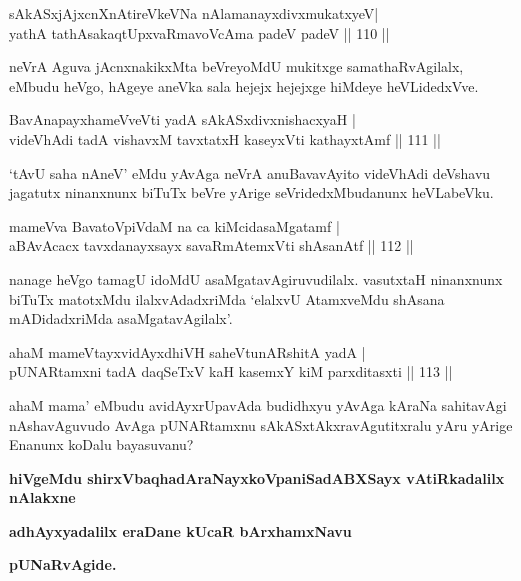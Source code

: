 \begin{shl}
sAkASxjAjxcnXnAtireVkeVNa nAlamanayxdivxmukatxyeV|\\
yathA tathA\s sakaqtUpxvaRmavoVcAma padeV padeV \hfill || 110 || 
\end{shl}

\begin{artha}
neVrA Aguva jAcnxnakikxMta beVreyoMdU mukitxge samathaRvAgilalx, eMbudu heVgo, hAgeye aneVka sala hejejx hejejxge hiMdeye heVLidedxVve.
\end{artha}


\begin{shl}
BavAnapayxhameVveVti yadA sAkASxdivxnishacxyaH |\\
videVhAdi tadA vishavxM tavxtatxH kaseyxVti kathayxtAmf \hfill || 111 || 
\end{shl}

\begin{artha}
`tAvU saha nAneV' eMdu yAvAga neVrA anuBavavAyito videVhAdi deVshavu jagatutx ninanxnunx biTuTx beVre yArige seVridedxMbudanunx heVLabeVku.
\end{artha}


\begin{shl}
mameVva BavatoV\s piVdaM na ca kiMcidasaMgatamf |\\
aBAvAcacx tavxdanayxsayx savaRmAtemxVti shAsanAtf  \hfill || 112 || 
\end{shl}

\begin{artha}
nanage heVgo tamagU idoMdU asaMgatavAgiruvudilalx. vasutxtaH ninanxnunx biTuTx matotxMdu ilalxvAdadxriMda `elalxvU AtamxveMdu shAsana mADidadxriMda asaMgatavAgilalx'.
\end{artha}

\begin{shl}
ahaM mameVtayxvidAyxdhiVH saheVtunARshitA yadA |\\
pUNARtamxni tadA daqSeTxV kaH kasemxY kiM parxditasxti \hfill || 113 || 
\end{shl}

\begin{artha}
ahaM mama' eMbudu avidAyxrUpavAda budidhxyu yAvAga kAraNa sahitavAgi nAshavAguvudo AvAga pUNARtamxnu sAkASxtAkxravAgutitxralu yAru yArige Enanunx koDalu bayasuvanu?
\end{artha}

\begin{center}
{\bf hiVgeMdu shirxVbaqhadAraNayxkoVpaniSadABXSayx vAtiRkadalilx nAlakxne}

\smallskip
{\bf adhAyxyadalilx eraDane kUcaR bArxhamxNavu}

\smallskip
{\bf pUNaRvAgide.}
\end{center}
